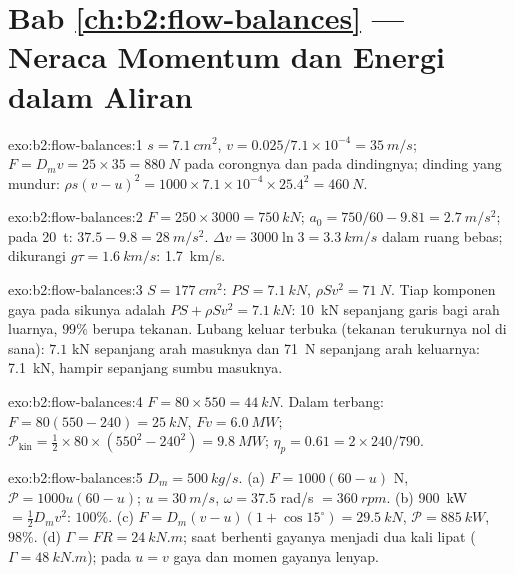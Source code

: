 \section*{Bab \ref{ch:b2:flow-balances} --- Neraca Momentum dan Energi dalam Aliran}

\begin{solution}{exo:b2:flow-balances:1}
$s = \qty{7.1}{cm^2}$, $v = 0.025/7.1 \times 10^{-4} = \qty{35}{m/s}$; $F = D_mv = 25
\times 35 = \qty{880}{N}$ pada corongnya dan pada dindingnya; dinding yang mundur: $\rho s(v -
u)^2 = 1000 \times 7.1 \times 10^{-4} \times 25.4^2 = \qty{460}{N}$.
\end{solution}

\begin{solution}{exo:b2:flow-balances:2}
$F = 250 \times 3000 = \qty{750}{kN}$; $a_0 = 750/60 - 9.81 = \qty{2.7}{m/s^2}$; pada
\qty{20}{t}: $37.5 - 9.8 = \qty{28}{m/s^2}$. $\Delta v = 3000\ln3 = \qty{3.3}{km/s}$ dalam
ruang bebas; dikurangi $g\tau = \qty{1.6}{km/s}$: \qty{1.7}{km/s}.
\end{solution}

\begin{solution}{exo:b2:flow-balances:3}
$S = \qty{177}{cm^2}$: $PS = \qty{7.1}{kN}$, $\rho Sv^2 = \qty{71}{N}$. Tiap komponen
gaya pada sikunya adalah $PS + \rho Sv^2 = \qty{7.1}{kN}$: \qty{10}{kN} sepanjang
garis bagi arah luarnya, $99\%$ berupa tekanan. Lubang keluar terbuka (tekanan terukurnya
nol di sana): $7.1$ kN sepanjang arah masuknya dan \qty{71}{N} sepanjang
arah keluarnya: \qty{7.1}{kN}, hampir sepanjang sumbu masuknya.
\end{solution}

\begin{solution}{exo:b2:flow-balances:4}
$F = 80 \times 550 = \qty{44}{kN}$. Dalam terbang: $F = 80(550 - 240) = \qty{25}{kN}$, $Fv =
\qty{6.0}{MW}$; $\mathcal P_{\text{kin}} = \tfrac12 \times 80 \times (550^2 - 240^2) =
\qty{9.8}{MW}$; $\eta_p = 0.61 = 2 \times 240/790$.
\end{solution}

\begin{solution}{exo:b2:flow-balances:5}
$D_m = \qty{500}{kg/s}$. (a) $F = 1000(60 - u)$ N, $\mathcal P = 1000u(60 - u)$; $u =
\qty{30}{m/s}$, $\omega = 37.5$ rad/s $= \qty{360}{rpm}$. (b) \qty{900}{kW} $=
\tfrac12D_mv^2$: $100\%$. (c) $F = D_m(v - u)(1 + \cos15^\circ) = \qty{29.5}{kN}$, $\mathcal P
= \qty{885}{kW}$, $98\%$. (d) $\Gamma = FR = \qty{24}{kN.m}$; saat berhenti gayanya
menjadi dua kali lipat ($\Gamma = \qty{48}{kN.m}$); pada $u = v$ gaya dan momen gayanya lenyap.
\end{solution}

